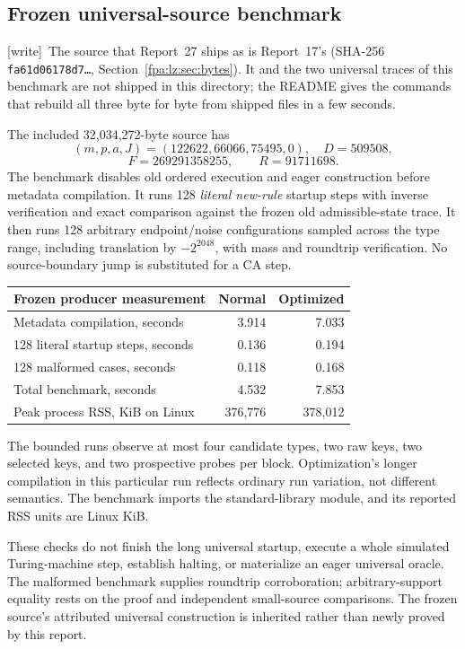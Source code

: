 \documentclass[11pt,a4paper]{article}
\numberwithin{equation}{section}
\newcommand{\file}[1]{\texttt{\detokenize{#1}}}
\newcommand{\wtag}{\textup{[write]}}
\begin{document}
\subsection{Frozen universal-source benchmark}
\wtag\ The source that Report~27 ships as  is Report~17's (SHA-256 \texttt{fa61d06178d7\ldots}, Section~\ref{fpa:lz:sec:bytes}). It and the two universal traces of this benchmark are not shipped in this directory; the README gives the commands that rebuild all three byte for byte from shipped files in a few seconds.

The included 32,034,272-byte source has
\[
(m,p,a,J)=(122622,66066,75495,0),\quad D=509508,
\]
\[
F=269291358255,\qquad R=91711698.
\]
The benchmark disables old ordered execution and eager construction before metadata compilation. It runs 128 \emph{literal new-rule} startup steps with inverse verification and exact comparison against the frozen old admissible-state trace. It then runs 128 arbitrary endpoint/noise configurations sampled across the type range, including translation by $-2^{2048}$, with mass and roundtrip verification. No source-boundary jump is substituted for a CA step.

\begin{center}
\begin{tabular}{@{}lrr@{}}
\toprule
Frozen producer measurement & Normal & Optimized \\ \midrule
Metadata compilation, seconds & 3.914 & 7.033 \\
128 literal startup steps, seconds & 0.136 & 0.194 \\
128 malformed cases, seconds & 0.118 & 0.168 \\
Total benchmark, seconds & 4.532 & 7.853 \\
Peak process RSS, KiB on Linux & 376,776 & 378,012 \\ \bottomrule
\end{tabular}
\end{center}
The bounded runs observe at most four candidate types, two raw keys, two selected keys, and two prospective probes per block. Optimization's longer compilation in this particular run reflects ordinary run variation, not different semantics. The benchmark imports the standard-library \file{resource} module, and its reported RSS units are Linux KiB.

These checks do not finish the long universal startup, execute a whole simulated Turing-machine step, establish halting, or materialize an eager universal oracle. The malformed benchmark supplies roundtrip corroboration; arbitrary-support equality rests on the proof and independent small-source comparisons. The frozen source's attributed universal construction is inherited rather than newly proved by this report.
\end{document}
